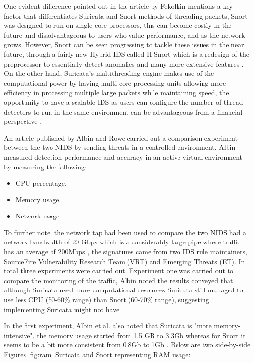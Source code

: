 \documentclass[12pt]{article}
\begin{document}
		One evident difference pointed out in the article by Fekolkin mentions a key factor that differentiates Suricata and Snort methods of threading packets, Snort was designed to run on single-core processors, this can become costly in the future and disadvantageous to users who value performance, and as the network grows. However, Snort can be seen progressing to tackle these issues in the near future, through a fairly new Hybrid IDS called H-Snort which is a redesign of the preprocessor to essentially detect anomalies and many more extensive features \cite{gmez_2009_design}. On the other hand, Suricata's multithreading engine makes use of the computational power by having multi-core processing units allowing more efficiency in processing multiple large packets while maintaining speed, the opportunity to have a scalable IDS as users can configure the number of thread detectors to run in the same environment can be advantageous from a financial perspective \cite{fekolkin_2015_intrusion}.
		
		An article published by Albin and Rowe carried out a comparison experiment between the two NIDS by sending threats in a controlled environment. Albin measured detection performance and accuracy in an active virtual environment by measuring the following:
		\begin{itemize}
			\item CPU percentage. 
			\item Memory usage.
			\item Network usage.
		\end{itemize}
		To further note, the network tap had been used to compare the two NIDS  had a network bandwidth of 20 Gbps which is a considerably large pipe where traffic has an average of 200Mbps \cite{albin_2012_a}, the signatures came from two IDS rule maintainers, SourceFire Vulnerability Research Team (VRT) and Emerging Threats (ET).
		In total three experiments were carried out.
		Experiment one was carried out to compare the monitoring of the traffic, Albin noted the results conveyed that although Suricata used more computational resources Suricata still managed to use less CPU (50-60\% range) than Snort (60-70\% range), suggesting implementing Suricata might not have 
		
		
		In the first experiment, Albin et al. also noted that Suricata is "more memory-intensive", the memory usage started from 1.5 GB to 3.3Gb whereas for Snort it seems to be a bit more consistent from 0.8Gb to 1Gb \cite{albin_2012_a}. Below are two side-by-side Figures \ref{fig:ram} Suricata and Snort representing RAM usage:
		
\end{document}
